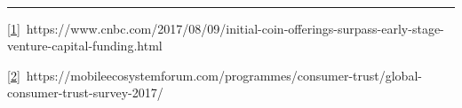 \documentclass[]{article}
\begin{document}
{}

{~~~~~~~~}

{}

{}

\begin{center}\rule{0.5\linewidth}{\linethickness}\end{center}

\protect\hyperlink{ftnt_ref1}{{[}1{]}}{~https://www.cnbc.com/2017/08/09/initial-coin-offerings-surpass-early-stage-venture-capital-funding.html}

\protect\hyperlink{ftnt_ref2}{{[}2{]}}{~https://mobileecosystemforum.com/programmes/consumer-trust/global-consumer-trust-survey-2017/}
\end{document}
